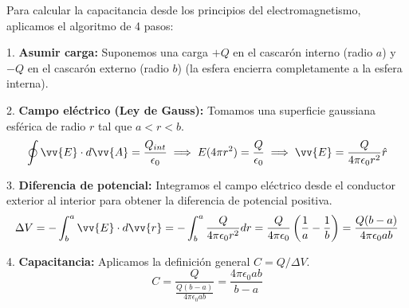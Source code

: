 \documentclass[11pt]{article}
\begin{document}
\begin{solucion}
    Para calcular la capacitancia desde los principios del electromagnetismo, aplicamos el algoritmo de 4 pasos:

    1. \textbf{Asumir carga:} Suponemos una carga $+Q$ en el cascarón interno (radio $a$) y $-Q$  en el cascarón externo (radio $b$) (la esfera encierra completamente a la esfera interna).

    2. \textbf{Campo eléctrico (Ley de Gauss):} Tomamos una superficie gaussiana esférica de radio $r$ tal que $a < r < b$.
    $$\oint \vv{E} \cdot d\vv{A} = \frac{Q_{int}}{\epsilon_0} \implies E(4\pi r^2) = \frac{Q}{\epsilon_0} \implies \vv{E} = \frac{Q}{4\pi\epsilon_0 r^2} \hat{r}$$

    3. \textbf{Diferencia de potencial:} Integramos el campo eléctrico desde el conductor exterior al interior para obtener la diferencia de potencial positiva.
    $$\Delta V = -\int_{b}^{a} \vv{E} \cdot d\vv{r} = -\int_{b}^{a} \frac{Q}{4\pi\epsilon_0 r^2} dr = \frac{Q}{4\pi\epsilon_0} \left( \frac{1}{a} - \frac{1}{b} \right) = \frac{Q(b-a)}{4\pi\epsilon_0 ab}$$

    4. \textbf{Capacitancia:} Aplicamos la definición general $C = Q / \Delta V$.
    $$C = \frac{Q}{\frac{Q(b-a)}{4\pi\epsilon_0 ab}} = \frac{4\pi\epsilon_0 ab}{b - a}$$
\end{solucion}
\end{document}
